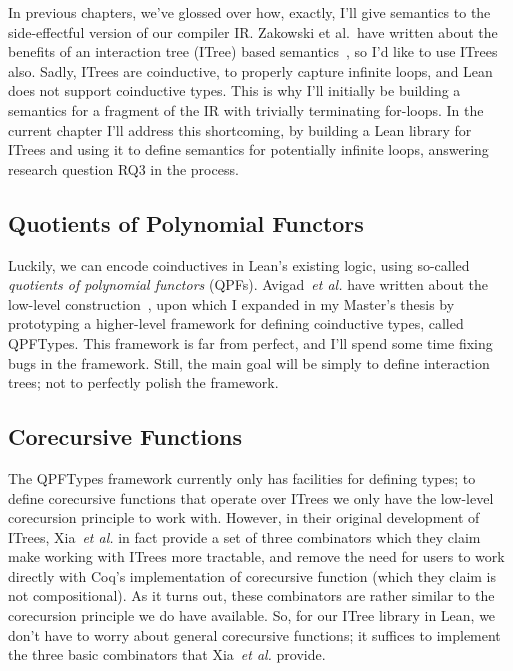 \documentclass[a4paper]{scrartcl}
\newcommand*{\etal}{~\emph{et al.}}
\begin{document}
In previous chapters, we've glossed over how, exactly, I'll give
semantics to the side-effectful version of our compiler IR. Zakowski et
al.~have written about the benefits of an interaction tree (ITree)
based semantics~\cite{zakowskiModularCompositionalExecutable2021, xiaInteractionTreesRepresenting2020}, so I'd like to use
ITrees also. Sadly, ITrees are coinductive, to properly capture infinite loops, 
and Lean does not support coinductive types.
This is why I'll initially be building a semantics for a fragment of the IR with
trivially terminating for-loops. 
In the current chapter I'll address this shortcoming, by building a Lean library for ITrees and using it to define semantics for potentially infinite loops,
answering research question \textsc{RQ3} in the process.

\subsection{Quotients of Polynomial
Functors}\label{quotients-of-polynomial-functors}

Luckily, we can encode coinductives in Lean's existing logic, using
so-called \emph{quotients of polynomial functors} (QPFs). Avigad\etal{} have written about the low-level construction~\cite{avigadDataTypesQuotients2019}, 
upon which I expanded in my Master's thesis by prototyping a higher-level framework for defining
coinductive types, called QPFTypes. This framework is far from perfect,
and I'll spend some time fixing bugs in the framework. Still, the main
goal will be simply to define interaction trees; not to perfectly polish
the framework.

\subsection{Corecursive Functions}\label{corecursive-functions}

The QPFTypes framework currently only has facilities for defining types;
to define corecursive functions that operate over ITrees we only have
the low-level corecursion principle to work with. However, in their
original development of ITrees, Xia\etal{} in fact provide a set of three
combinators which they claim make working with ITrees more tractable,
and remove the need for users to work directly with Coq's implementation
of corecursive function (which they claim is not compositional). As it
turns out, these combinators are rather similar to the corecursion
principle we do have available. So, for our ITree library
in Lean, we don't have to worry about general corecursive functions; it
suffices to implement the three basic combinators that Xia\etal{} provide.
\end{document}
